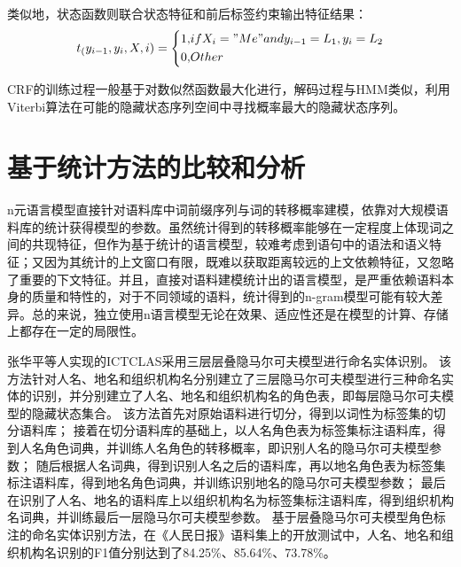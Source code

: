 类似地，状态函数则联合状态特征和前后标签约束输出特征结果：
\begin{equation}
    t_(y_{i-1}, y_i, X, i) = \left\{
        \begin{aligned}
            1, &if X_i = "Me" and y_{i-1} = L_1, y_i = L_2\\
            0, &Other
        \end{aligned}
    \right.
\end{equation}

CRF的训练过程一般基于对数似然函数最大化进行，解码过程与HMM类似，利用Viterbi算法在可能的隐藏状态序列空间中寻找概率最大的隐藏状态序列。

\section{基于统计方法的比较和分析}
n元语言模型直接针对语料库中词前缀序列与词的转移概率建模，依靠对大规模语料库的统计获得模型的参数。虽然统计得到的转移概率能够在一定程度上体现词之间的共现特征，但作为基于统计的语言模型，较难考虑到语句中的语法和语义特征；又因为其统计的上文窗口有限，既难以获取距离较远的上文依赖特征，又忽略了重要的下文特征。并且，直接对语料建模统计出的语言模型，是严重依赖语料本身的质量和特性的，对于不同领域的语料，统计得到的n-gram模型可能有较大差异。总的来说，独立使用n语言模型无论在效果、适应性还是在模型的计算、存储上都存在一定的局限性。

张华平等人实现的ICTCLAS采用三层层叠隐马尔可夫模型进行命名实体识别。
该方法针对人名、地名和组织机构名分别建立了三层隐马尔可夫模型进行三种命名实体的识别，并分别建立了人名、地名和组织机构名的角色表，即每层隐马尔可夫模型的隐藏状态集合。
该方法首先对原始语料进行切分，得到以词性为标签集的切分语料库；
接着在切分语料库的基础上，以人名角色表为标签集标注语料库，得到人名角色词典，并训练人名角色的转移概率，即识别人名的隐马尔可夫模型参数；
随后根据人名词典，得到识别人名之后的语料库，再以地名角色表为标签集标注语料库，得到地名角色词典，并训练识别地名的隐马尔可夫模型参数；
最后在识别了人名、地名的语料库上以组织机构名为标签集标注语料库，得到组织机构名词典，并训练最后一层隐马尔可夫模型参数。
基于层叠隐马尔可夫模型角色标注的命名实体识别方法，在《人民日报》语料集上的开放测试中，人名、地名和组织机构名识别的F1值分别达到了84.25\%、85.64\%、73.78\%。

